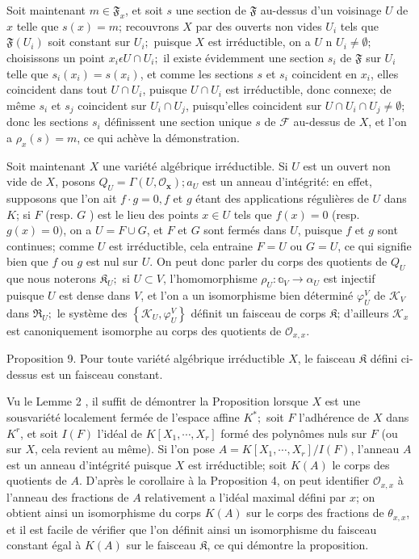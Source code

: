 Soit maintenant $m \in \mathfrak{F}_{x}$, et soit $s$ une section de $\mathfrak{F}$ au-dessus d'un voisinage $U$ de $x$ telle que $s(x)=m$; recouvrons $X$ par des ouverts non vides $U_{i}$ tels que $\mathfrak{F}\left(U_{i}\right)$ soit constant sur $U_{i} ;$ puisque $X$ est irréductible, on a $U$ n $U_{i} \neq \emptyset ;$ choisissons un point $x_{i} \epsilon U \cap U_{i} ;$ il existe évidemment une section $s_{i}$ de $\mathfrak{F}$ sur $U_{i}$ telle que $s_{i}\left(x_{i}\right)=s\left(x_{i}\right)$, et comme les sections $s$ et $s_{i}$ coincident en $x_{i}$, elles coincident dans tout $U \cap U_{i}$, puisque $U \cap U_{i}$ est irréductible, donc connexe; de même $s_{i}$ et $s_{j}$ coincident sur $U_{i} \cap U_{j}$, puisqu'elles coincident sur $U \cap U_{i} \cap U_{j} \neq \emptyset$; donc les sections $s_{i}$ définissent une section unique $s$ de $\mathcal{F}$ au-dessus de $X$, et l'on a $\rho_{x}(s)=m$, ce qui achève la démonstration.

Soit maintenant $X$ une variété algébrique irréductible. Si $U$ est un ouvert non vide de $X$, posons $Q_{U}=\Gamma\left(U, \mathcal{O}_{\mathbf{x}}\right) ; a_{U}$ est un anneau d'intégrité: en effet, supposons que l'on ait $f \cdot g=0, f$ et $g$ étant des applications régulières de $U$ dans $K$; si $F$ (resp. $G$ ) est le lieu des points $x \in U$ tels que $f(x)=0$ (resp. $g(x)=0)$, on a $U=F \cup G$, et $F$ et $G$ sont fermés dans $U$, puisque $f$ et $g$ sont continues; comme $U$ est irréductible, cela entraine $F=U$ ou $G=U$, ce qui signifie bien que $f$ ou $g$ est nul sur $U$. On peut donc parler du corps des quotients de $Q_{U}$ que nous noterons $\mathfrak{K}_{U} ;$ si $U \subset V$, l'homomorphisme $\rho_{U}: \mathbb{a}_{V} \rightarrow \alpha_{U}$ est injectif puisque $U$ est dense dans $V$, et l'on a un isomorphisme bien déterminé $\varphi_{U}^{V}$ de $\mathscr{K}_{V}$ dans $\Re_{U} ;$ le système des $\left\{\mathscr{K}_{U}, \varphi_{U}^{V}\right\}$ définit un faisceau de corps $\mathfrak{K}$; d'ailleurs $\mathcal{K}_{x}$ est canoniquement isomorphe au corps des quotients de $\mathcal{O}_{x, x}$.

Proposition 9. Pour toute variété algébrique irréductible $X$, le faisceau $\mathfrak{K}$ défini ci-dessus est un faisceau constant.

Vu le Lemme 2 , il suffit de démontrer la Proposition lorsque $X$ est une sousvariété localement fermée de l'espace affine $K^{*} ;$ soit $F$ l'adhérence de $X$ dans $K^{r}$, et soit $I(F)$ l'idéal de $K\left[X_{1}, \cdots, X_{r}\right]$ formé des polynômes nuls sur $F$ (ou sur $X$, cela revient au même). Si l'on pose $A=K\left[X_{1}, \cdots, X_{r}\right] / I(F)$, l'anneau $A$ est un anneau d'intégrité puisque $X$ est irréductible; soit $K(A)$ le corps des quotients de $A$. D'après le corollaire à la Proposition 4, on peut identifier $\mathcal{O}_{x, x}$ à l'anneau des fractions de $A$ relativement a l'idéal maximal défini par $x$; on obtient ainsi un isomorphisme du corps $K(A)$ sur le corps des fractions de $\theta_{x, x}$, et il est facile de vérifier que l'on définit ainsi un isomorphisme du faisceau constant égal à $K(A)$ sur le faisceau $\mathfrak{K}$, ce qui démontre la proposition.

